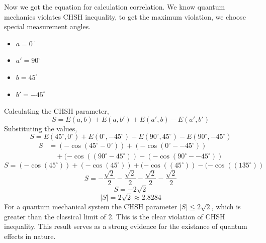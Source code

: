 \documentclass[17pt,a4paper]{extarticle}
\begin{document}
Now we got the equation for calculation correlation. We know quantum mechanics violates CHSH inequality, to get the maximum violation, we choose special measurement angles.
\begin{itemize}
\item $a=0^\circ$
\item $a'=90^\circ$
\item $b=45^\circ$
\item $b'=-45^\circ$
\end{itemize}
Calculating the CHSH parameter,
\[
S = E(a,b) + E(a,b') + E(a',b) - E(a',b')
\]
Substituting the values,
\[
S = E(45^\circ,0^\circ) + E(0^\circ,-45^\circ) + E(90^\circ,45^\circ) - E(90^\circ,-45^\circ)
\]
\begin{equation*}
\begin{aligned}
S &= (-\cos(45^\circ-0^\circ)) + (-\cos(0^\circ--45^\circ)) \\
&\quad+ (-\cos((90^\circ-45^\circ)) - (-\cos(90^\circ--45^\circ))
\end{aligned}
\end{equation*}
\[
S = (-\cos(45^\circ)) + (-\cos(45^\circ)) + (-\cos((45^\circ)) - (-\cos((135^\circ))
\]
\[
S = -\frac{\sqrt{2}}{2} - \frac{\sqrt{2}}{2} - \frac{\sqrt{2}}{2} - \frac{\sqrt{2}}{2}
\]
\[
S = -2\sqrt{2}
\]
\[
|S| = 2\sqrt{2} \approx 2.8284
\]
For a quantum mechanical system the CHSH parameter $|S| \leq 2\sqrt{2}$, which is greater than the classical limit of 2. This is the clear violation of CHSH inequality. This result serves as a strong evidence for the existance of quantum effects in nature.
\end{document}
